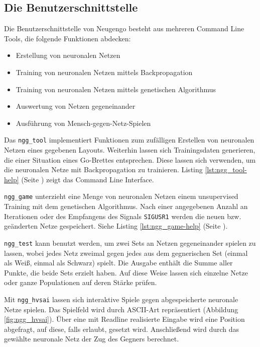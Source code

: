 \subsection{Die Benutzerschnittstelle}
\begin{samepage}
Die Benutzerschnittstelle von Neugengo besteht aus mehreren Command Line Tools,
die folgende Funktionen abdecken:
\begin{itemize}
    \item Erstellung von neuronalen Netzen
    \item Training von neuronalen Netzen mittels Backpropagation
    \item Training von neuronalen Netzen mittels genetischen Algorithmus
    \item Auswertung von Netzen gegeneinander
    \item Ausführung von Mensch-gegen-Netz-Spielen
\end{itemize}
\end{samepage}

Das \texttt{ngg\_tool} implementiert Funktionen zum zufälligen Erstellen von
neuronalen Netzen eines gegebenen Layouts. Weiterhin lassen sich Trainingsdaten
generieren, die einer Situation eines Go-Brettes entsprechen. Diese lassen sich
verwenden, um die neuronalen Netze mit Backpropagation zu trainieren.
Listing \ref{lst:ngg_tool-help} (Seite \pageref{lst:ngg_tool-help}) zeigt das
Command Line Interface.

\texttt{ngg\_game} unterzieht eine Menge von neuronalen Netzen einem
unsupervised Training mit dem genetischen Algorithmus. Nach einer angegebenen
Anzahl an Iterationen oder des Empfangens des Signals \texttt{SIGUSR1} werden
die neuen bzw. geänderten Netze gespeichert.
Siehe Listing \ref{lst:ngg_game-help} (Seite \pageref{lst:ngg_game-help}).

\texttt{ngg\_test} kann benutzt werden, um zwei Sets an Netzen gegeneinander
spielen zu lassen, wobei jedes Netz zweimal gegen jedes aus dem gegnerischen
Set (einmal als Weiß, einmal als Schwarz) spielt. Die Ausgabe enthält die Summe
aller Punkte, die beide Sets erzielt haben. Auf diese Weise lassen sich einzelne
Netze oder ganze Populationen auf deren Stärke prüfen. 

Mit \texttt{ngg\_hvsai} lassen sich interaktive Spiele gegen abgespeicherte
neuronale Netze spielen. Das Spielfeld wird durch ASCII-Art repräsentiert
(Abbildung \ref{fig:ngg_hvsai}). Über eine mit Readline \cite{readline}
realisierte Eingabe wird eine Position abgefragt, auf diese, falls erlaubt,
gesetzt wird. Anschließend wird durch das gewählte neuronale Netz der Zug des
Gegners berechnet.

